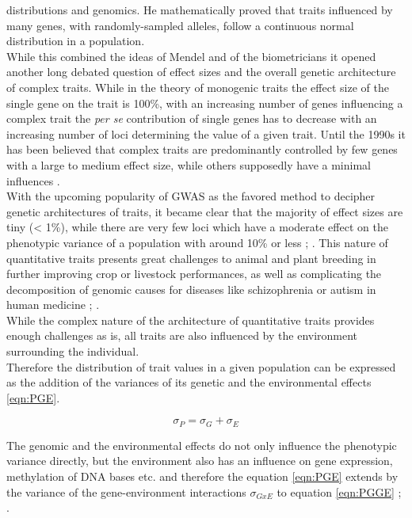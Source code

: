 distributions and genomics. He mathematically proved that traits influenced by many genes,
with randomly-sampled alleles, follow a continuous normal distribution in a
population. \\
While this combined the ideas of Mendel and of the biometricians it opened another long
debated question of effect sizes and the overall genetic architecture of complex
traits. While in the theory of monogenic traits the effect size of the single gene on the
trait is 100\%, with an increasing number of genes influencing a complex trait the
\textit{per se} contribution of single genes has to decrease with an increasing number of
loci determining the value of a given trait. Until the 1990s it has been believed that
complex traits are predominantly controlled by few genes with a
large to medium effect size, while others supposedly have a minimal influences \cite{zhang2018esti}. \\
With the upcoming popularity of GWAS as the favored method to decipher genetic
architectures of traits, it became clear that the
majority of effect sizes are tiny (< 1\%), while there are very few loci which have a
moderate effect on the phenotypic variance of a population with around 10\% or less
\cite{stringer2011}; \cite{korte2013advantages}. This nature of quantitative traits
presents great challenges to animal \cite{goddard2009} and plant breeding
\cite{wurschum2012} in further improving crop or livestock performances, as well as
complicating the decomposition of genomic causes for diseases like schizophrenia or autism in human medicine \cite{de2014}; \cite{purcell2014}. \\
While the complex nature of the architecture of quantitative traits provides enough
challenges as is, all traits are also influenced by the environment surrounding the individual.\\
Therefore the distribution of trait values in a given population can be expressed as the
addition of the variances of its genetic and the environmental effects \ref{eqn:PGE}.

\begin{equation}
 \sigma_{P} = \sigma_{G} + \sigma_{E}
 \label{eqn:PGE}
\end{equation}

The genomic and the environmental effects do not only influence the phenotypic variance directly, but
the environment also has an influence on gene expression, methylation of DNA bases etc. and
therefore the equation \ref{eqn:PGE} extends by the variance of the gene-environment
interactions $\sigma_{GxE}$  to equation \ref{eqn:PGGE}  \cite{lynch1998}; \cite{walsh2018}.
    
